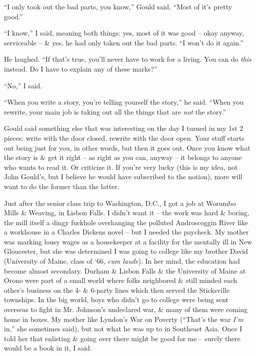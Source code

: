 \documentclass{article}
\numberwithin{equation}{section}
\begin{document}
``I only took out the bad parts, you know,'' Gould said. ``Most of it's pretty good.''

``I know,'' I said, meaning both things: yes, most of it was good -- okay anyway, serviceable -- \& yes, he had only taken out the bad parts. ``I won't do it again.''

He laughed. ``If that's true, you'll never have to work for a living. You can do \textit{this} instead. Do I have to explain any of these marks?''

``No,'' I said.

``When you write a story, you're telling yourself the story,'' he said. ``When you rewrite, your main job is taking out all the things that are \textit{not} the story.''

Gould said something else that was interesting on the day I turned in my 1st 2 pieces: write with the door closed, rewrite with the door open. Your stuff starts out being just for you, in other words, but then it goes out. Once you know what the story is \& get it right -- as right as you can, anyway -- it belongs to anyone who wants to read it. Or criticize it. If you're very lucky (this is my idea, not John Gould's, but I believe he would have subscribed to the notion), more will want to do the former than the latter.

 Just after the senior class trip to Washington, D.C., I got a job at Worumbo Mills \& Weaving, in Lisbon Falls. I didn't want it -- the work was hard \& boring, the mill itself a dingy fuckhole overhanging the polluted Androscoggin River like a workhouse in a Charles Dickens novel -- but I needed the paycheck. My mother was marking lousy wages as a housekeeper at a facility for the mentally ill in New Gloucester, but she was determined I was going to college like my brother David (University of Maine, class of `66, \textit{cum laude}). In her mind, the education had become almost secondary. Durham \& Lisbon Falls \& the University of Maine at Orono were part of a small world where folks neighbored \& still minded each other's business on the 4- \& 6-party lines which then served the Sticksville townships. In the big world, boys who didn't go to college were being sent overseas to fight in Mr. Johnson's undeclared war, \& many of them were coming home in boxes. My mother like Lyndon's War on Poverty (``That's the war \textit{I'm} in,'' she sometimes said), but not what he was up to in Southeast Asia. Once I told her that enlisting \& going over there might be good for me -- surely there would be a book in it, I said.
\end{document}
